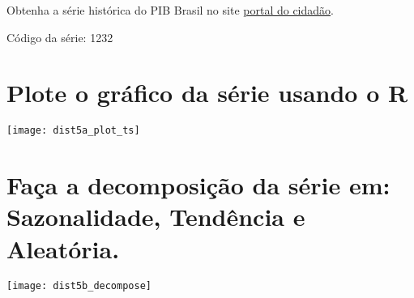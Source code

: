 Obtenha a série histórica do PIB Brasil no site \href{http://www.bcb.gov.br/pre/portalCidadao/cadsis/series.asp?idpai=PORTALBCB}{portal do cidadão}.

Código da série: 1232

\section{Plote o gráfico da série usando o R}

\begin{center}
\begin{centering}
\texttt{[image: dist5a\_plot\_ts]}
\par\end{centering}
\par\end{center}

\section{Faça a decomposição da série em: Sazonalidade, Tendência e Aleatória.}

\begin{center}
\begin{centering}
\texttt{[image: dist5b\_decompose]}
\par\end{centering}
\par\end{center}

